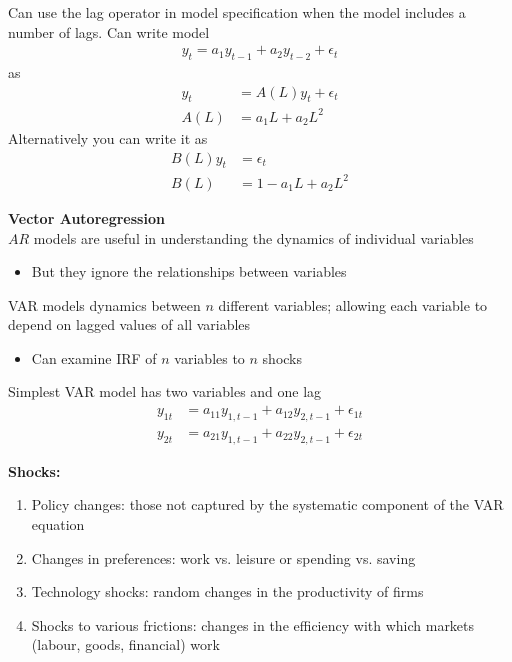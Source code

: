 \documentclass{beamer}
\begin{document}
\begin{frame}
 Can use the lag operator in model specification when the model includes a number of lags.
 Can write model 
  \begin{align}
    y_t = a_1 y_{t-1} + a_2 y_{t-2} + \epsilon_t
  \end{align}
  \medskip
  as
  \begin{align}
    y_t &= A(L)y_t + \epsilon_t \\ 
    A(L) &= a_1 L + a_2 L^2
  \end{align}
  \medskip
  Alternatively you can write it as
  \begin{align}
    B(L)y_t &= \epsilon_t\\
    B(L) &= 1-a_1 L + a_2 L^2
  \end{align}  
\end{frame}

\begin{frame}
  \textbf{Vector Autoregression}\\
  $AR$ models are useful in understanding the dynamics of individual variables
  \begin{itemize}
    \item But they ignore the relationships between variables
  \end{itemize}
  \medskip
  VAR models dynamics between $n$ different variables; allowing each variable to depend on lagged values of all variables
  \begin{itemize}
    \item Can examine IRF of $n$ variables to $n$ shocks
  \end{itemize}
  \medskip
  Simplest VAR model has two variables and one lag
  \begin{align}
    y_{1t} &= a_{11} y_{1, t-1} + a_{12} y_{2,t-1} + \epsilon_{1t}\\ \nonumber
    y_{2t} &= a_{21} y_{1, t-1} + a_{22} y_{2,t-1} + \epsilon_{2t}
  \end{align}
\end{frame}


\begin{frame}
  \textbf{Shocks:}\medskip  
  \begin{enumerate}
    \item Policy changes: those not captured by the systematic component of the VAR equation
    \item Changes in preferences:  work vs. leisure or spending vs. saving
    \item Technology shocks: random changes in the productivity of firms
    \item Shocks to various frictions: changes in the efficiency with which markets (labour, goods, financial) work
  \end{enumerate}
\end{frame}
\end{document}
